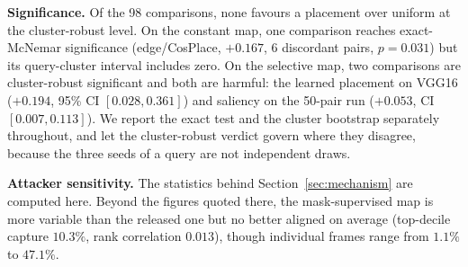 \documentclass[10pt,journal]{IEEEtran}
\begin{document}
\begin{table}[t]
\centering
\caption{Placement-rule study. $\Delta$ is the mean paired Top-1 difference against the uniform reference; positive means \emph{worse} privacy. ``Zero-disc.'' counts comparisons (of 7 run--backbone cells) with no discordant pairs. No placement is significantly better than uniform in either checkpoint.}
\label{tab:placement_full}
\end{table}

\textbf{Significance.} Of the 98 comparisons, none favours a placement over
uniform at the cluster-robust level. On the constant map, one comparison
reaches exact-McNemar significance (edge/CosPlace, $+0.167$, 6 discordant
pairs, $p=0.031$) but its query-cluster interval includes zero. On the
selective map, two comparisons are cluster-robust significant and both are
harmful: the learned placement on VGG16 ($+0.194$, 95\% CI
$[0.028, 0.361]$) and saliency on the 50-pair run ($+0.053$, CI
$[0.007, 0.113]$). We report the exact test and the cluster bootstrap
separately throughout, and let the cluster-robust verdict govern where they
disagree, because the three seeds of a query are not independent draws.

\textbf{Attacker sensitivity.} The statistics behind
Section~\ref{sec:mechanism} are computed here. Beyond the figures quoted
there, the mask-supervised map is more variable than the released one but no
better aligned on average (top-decile capture $10.3\%$, rank correlation
$0.013$), though individual frames range from $1.1\%$ to $47.1\%$.
\end{document}
